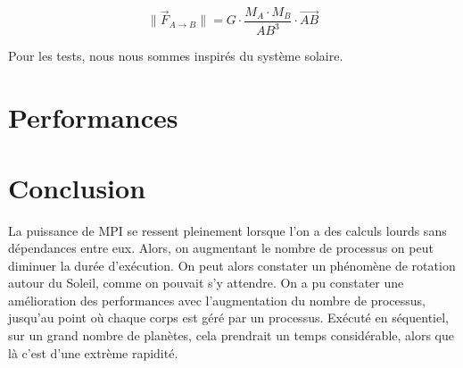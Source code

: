 \documentclass[a4paper,11pt]{article}
\begin{document}
\[
\| \vec{F}_{A\rightarrow B} \| = G \cdot \frac{M_A \cdot M_B}{\mathit{AB^3}} \cdot \mathit{\vec{AB}}
\]


Pour les tests, nous nous sommes inspirés du système solaire.

\section{Performances}



\section{Conclusion}

La puissance de MPI se ressent pleinement lorsque l'on a des calculs lourds sans dépendances entre eux. Alors, on augmentant le nombre de processus on peut diminuer la durée d'exécution. On peut alors constater un phénomène de rotation autour du Soleil, comme on pouvait s'y attendre. On a pu constater une amélioration des performances avec l'augmentation du nombre de processus, jusqu'au point où chaque corps est géré par un processus. Exécuté en séquentiel, sur un grand nombre de planètes, cela prendrait un temps considérable, alors que là c'est d'une extrème rapidité.
\end{document}
